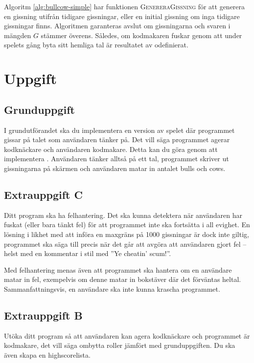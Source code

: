 \documentclass[a4paper]{miunasgn}
\theoremstyle{definition}
\begin{document}
Algoritm \ref{alg:bullcow-simple} har funktionen \textsc{GenereraGissning} för 
att generera en gissning utifrån tidigare gissningar, eller en initial gissning 
om inga tidigare gissningar finns.
Algoritmen garanteras avslut om gissningarna och svaren i mängden \(G\) stämmer 
överens.
Således, om kodmakaren fuskar genom att under spelets gång byta sitt hemliga 
tal är resultatet av  odefinierat.


\section{Uppgift}
\label{sec:Tasks}
\noindent


\subsection{Grunduppgift}
\noindent
I grundutförandet ska du implementera en version av spelet där programmet 
gissar på talet som användaren tänker på.
Det vill säga programmet agerar kodknäckare och användaren kodmakare.
Detta kan du göra genom att implementera .
Användaren tänker alltså på ett tal, programmet skriver ut gissningarna på 
skärmen och användaren matar in antalet bulls och cows.

\subsection{Extrauppgift C}
\noindent
Ditt program ska ha felhantering.
Det ska kunna detektera när användaren har fuskat (eller bara tänkt fel) för 
att programmet inte ska fortsätta i all evighet.
En lösning i likhet med att införa en maxgräns på 1000 gissningar är dock inte 
giltig, programmet ska säga till precis när det går att avgöra att användaren 
gjort fel -- helst med en kommentar i stil med ''Ye cheatin' scum!''.

Med felhantering menas även att programmet ska hantera om en användare matar in 
fel, exempelvis om denne matar in bokstäver där det förväntas heltal.
Sammanfattningsvis, en användare ska inte kunna krascha programmet.

\subsection{Extrauppgift B}
\noindent
Utöka ditt program så att användaren kan agera kodknäckare och programmet är 
kodmakare, det vill säga ombytta roller jämfört med grunduppgiften.
Du ska även skapa en highscorelista.
\end{document}
